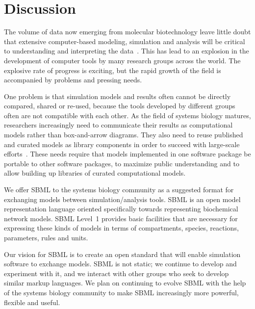 \documentclass[10pt]{cekarticle}
\newcommand{\changed}[1]{\textcolor{BrickRed}{#1}}
\begin{document}
\section{Discussion}
\label{sec:discussion}

The volume of data now emerging from molecular biotechnology
leave little doubt that extensive computer-based modeling, simulation and
analysis will be critical to understanding and interpreting the
data~\citep{abbott:1999,gilman:2000,popel:1998,smaglik:2000}.  This
has lead to an explosion in the development of computer tools by many
research groups across the world.  The explosive rate of progress is
exciting, but the rapid growth of the field is accompanied by problems and
pressing needs.

One problem is that simulation models and results often cannot be directly
compared, shared or re-used, because the tools developed by different
groups often are not compatible with each other.  As the field of systems
biology matures, researchers increasingly need to communicate their results
as computational models rather than box-and-arrow diagrams.  They also need
to reuse published and curated models as library components in order to
succeed with large-scale efforts~\cite[e.g., the Alliance for Cellular
Signaling;][]{gilman:2000,smaglik:2000}.  These needs require that models
implemented in one software package be portable to other software packages,
to maximize public understanding and to allow building up libraries of
curated computational models.

We offer SBML to the systems biology community as a suggested format for
exchanging models between simulation/analysis tools.  SBML is an open model
representation language oriented specifically towards representing
biochemical network models.  \changed{SBML Level~1 provides basic
  facilities} that are necessary for expressing these kinds of models in
terms of compartments, species, reactions, parameters, rules and units.

Our vision for SBML is to create an open standard that will enable
simulation software to exchange models.  SBML is not static; we continue to
develop and experiment with it, and we interact with other groups who seek
to develop similar markup languages.  We plan on continuing to evolve SBML
with the help of the systems biology community to make SBML increasingly
more powerful, flexible and useful.
\end{document}
